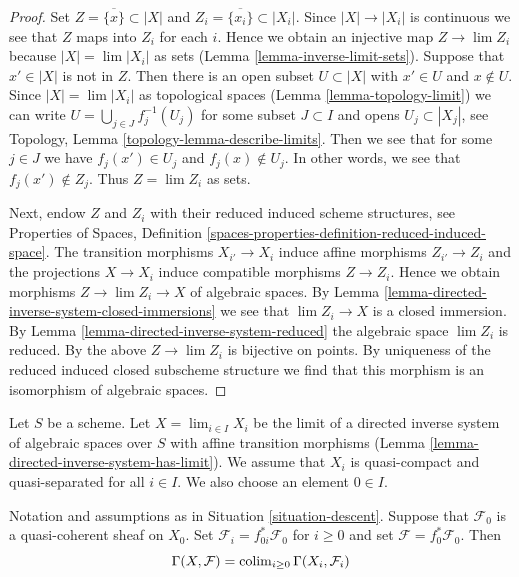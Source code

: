 \begin{proof}
Set $Z = \overline{\{x\}} \subset |X|$ and
$Z_i = \overline{\{x_i\}} \subset |X_i|$.
Since $|X| \to |X_i|$ is continuous we see that $Z$ maps into $Z_i$
for each $i$. Hence we obtain an injective map $Z \to \lim Z_i$
because $|X| = \lim |X_i|$ as sets (Lemma \ref{lemma-inverse-limit-sets}).
Suppose that $x' \in |X|$ is not in $Z$.
Then there is an open subset $U \subset |X|$ with $x' \in U$
and $x \not \in U$. Since
$|X| = \lim |X_i|$ as topological spaces (Lemma \ref{lemma-topology-limit})
we can write $U = \bigcup_{j \in J} f_j^{-1}(U_j)$
for some subset $J \subset I$ and opens $U_j \subset |X_j|$, see
Topology, Lemma \ref{topology-lemma-describe-limits}.
Then we see that for some $j \in J$ we have $f_j(x') \in U_j$
and $f_j(x) \not \in U_j$. In other words, we see that $f_j(x') \not \in Z_j$.
Thus $Z = \lim Z_i$ as sets.

\medskip\noindent
Next, endow $Z$ and $Z_i$ with their reduced induced scheme structures, see
Properties of Spaces, Definition
\ref{spaces-properties-definition-reduced-induced-space}.
The transition morphisms $X_{i'} \to X_i$ induce affine
morphisms $Z_{i'} \to Z_i$ and the projections $X \to X_i$
induce compatible morphisms $Z \to Z_i$.
Hence we obtain morphisms $Z \to \lim Z_i \to X$ of algebraic spaces.
By Lemma \ref{lemma-directed-inverse-system-closed-immersions}
we see that $\lim Z_i \to X$ is a
closed immersion. By Lemma \ref{lemma-directed-inverse-system-reduced}
the algebraic space $\lim Z_i$ is reduced.
By the above $Z \to \lim Z_i$ is bijective on points.
By uniqueness of the reduced induced closed subscheme structure
we find that this morphism is an isomorphism of algebraic spaces.
\end{proof}

\begin{situation}
\label{situation-descent}
Let $S$ be a scheme. Let $X = \lim_{i \in I} X_i$ be the limit of a directed
inverse system of algebraic spaces over $S$ with affine transition morphisms
(Lemma \ref{lemma-directed-inverse-system-has-limit}).
We assume that $X_i$ is quasi-compact and quasi-separated for all $i \in I$.
We also choose an element $0 \in I$.
\end{situation}

\begin{lemma}
\label{lemma-descend-section}
Notation and assumptions as in Situation \ref{situation-descent}.
Suppose that $\mathcal{F}_0$ is a quasi-coherent sheaf on $X_0$.
Set $\mathcal{F}_i = f_{0i}^*\mathcal{F}_0$ for $i \geq 0$ and set
$\mathcal{F} = f_0^*\mathcal{F}_0$. Then
$$
\Gamma(X, \mathcal{F}) = \mathop{\mathrm{colim}}\nolimits_{i \geq 0} \Gamma(X_i, \mathcal{F}_i)
$$
\end{lemma}

